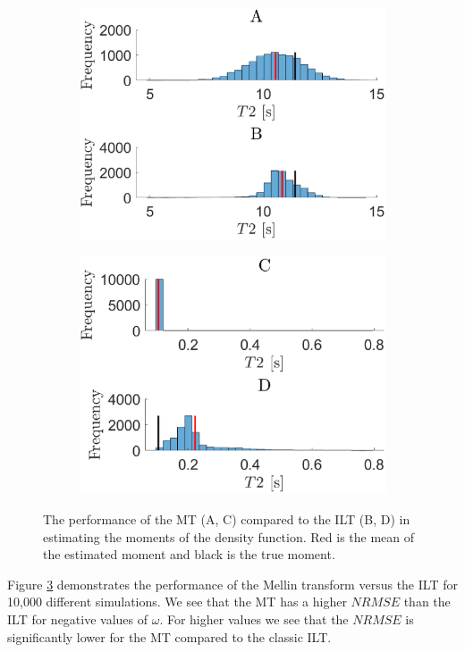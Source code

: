 \begin{figure}[t]
    \centering
    \begin{subfigure}[b]{0.49\textwidth}
        \includegraphics[width=\textwidth]{backgroundVector/moment-5e-1.eps}
        \label{fig:moment5e-1Estimate}
    \end{subfigure}
    \begin{subfigure}[b]{0.49\textwidth}
        \includegraphics[width=\textwidth]{backgroundVector/moment5e-1.eps}
        \label{fig:moment1Estimate}
    \end{subfigure}
    
    \caption{The performance of the MT (A, C) compared to the ILT (B, D) in estimating the moments of the density function. Red is the mean of the estimated moment and black is the true moment.}
    \label{fig:estimateMoments}
\end{figure}
Figure \ref{fig:estimateMoments} demonstrates the performance of the Mellin transform versus the ILT for 10,000 different simulations. We see that the MT has a higher $NRMSE$ than the ILT for negative values of $\omega$. For higher values we see that the $NRMSE$ is significantly lower for the MT compared to the classic ILT.

